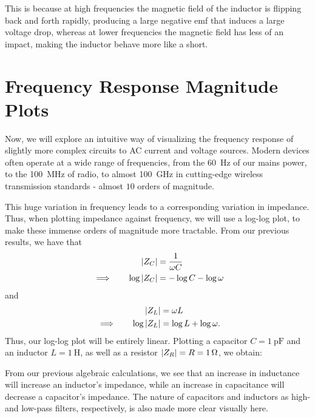 \documentclass[letterpaper]{article}
\theoremstyle{remark}
\DeclarePairedDelimiter\abs{\lvert}{\rvert}%
\newcommand{\eqn}[1]{\begin{alignat*}{2}#1\end{alignat*}}
\newcommand*{\thus}{&\implies\quad&}
\begin{document}
This is because at high frequencies the magnetic field of the inductor is flipping back and forth rapidly, producing a large negative emf that induces a large voltage drop, whereas at lower frequencies the magnetic field has less of an impact, making the inductor behave more like a short.

\section{Frequency Response Magnitude Plots}
Now, we will explore an intuitive way of visualizing the frequency response of slightly more complex circuits to AC current and voltage sources. Modern devices often operate at a wide range of frequencies, from the \SI{60}{\hertz} of our mains power, to the \SI{100}{\mega\hertz} of radio, to almost \SI{100}{\giga\hertz} in cutting-edge wireless transmission standards - almost $10$ orders of magnitude. 

This huge variation in frequency leads to a corresponding variation in impedance. Thus, when plotting impedance against frequency, we will use a log-log plot, to make these immense orders of magnitude more tractable. From our previous results, we have that
\eqn{
    && \abs{Z_C} &= \frac{1}{\omega C} \\
    \thus \log{\abs{Z_C}} &= -\log{C} - \log{\omega}
}
and
\eqn{
    && \abs{Z_L} &= \omega L \\
    \thus \log{\abs{Z_L}} &= \log{L} + \log{\omega}.
}
Thus, our log-log plot will be entirely linear. Plotting a capacitor $C = \SI{1}{\pico\farad}$ and an inductor $L = \SI{1}{\henry}$, as well as a resistor $\abs{Z_R} = R = \SI{1}{\ohm}$, we obtain:
\begin{center}
\end{center}
From our previous algebraic calculations, we see that an increase in inductance will increase an inductor's impedance, while an increase in capacitance will decrease a capacitor's impedance. The nature of capacitors and inductors as high- and low-pass filters, respectively, is also made more clear visually here.
\end{document}
